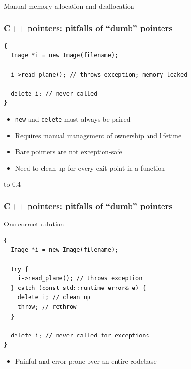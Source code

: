 \documentclass[handout]{beamer}
\begin{document}
\begin{frame}[fragile]
\begin{block}{Manual memory allocation and deallocation}
  \frametitle{C++ pointers: pitfalls of “dumb” pointers}
  \begin{lstlisting}
{
  Image *i = new Image(filename);

  i->read_plane(); // throws exception; memory leaked

  delete i; // never called
}
\end{lstlisting}
  \begin{itemize}
  \item \texttt{new} and \texttt{delete} must always be paired
  \item Requires manual management of ownership and lifetime
  \item Bare pointers are not exception-safe
    \pause
  \item Need to clean up for every exit point in a function
  \end{itemize}
\end{block}
\vbox to 0.4\textheight{%
}%
\end{frame}

\begin{frame}[fragile]
  \frametitle{C++ pointers: pitfalls of “dumb” pointers}
  \begin{block}{One correct solution}
  \begin{lstlisting}
{
  Image *i = new Image(filename);

  try {
    i->read_plane(); // throws exception
  } catch (const std::runtime_error& e) {
    delete i; // clean up
    throw; // rethrow
  }

  delete i; // never called for exceptions
}
\end{lstlisting}
  \begin{itemize}
    \pause
  \item Painful and error prone over an entire codebase
  \end{itemize}
  \end{block}
\end{frame}
\end{document}
